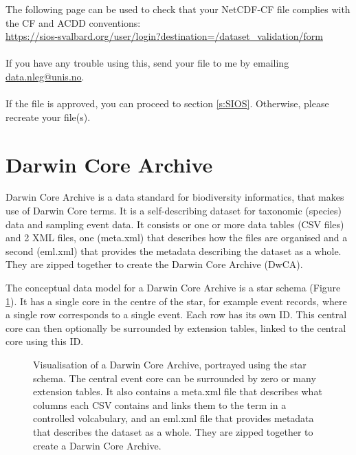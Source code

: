 \documentclass[a4paper,english, 11pt]{article}
\makeatletter
\newcommand{\emailme}{\href{mailto:data.nleg@unis.no}{data.nleg@unis.no}}
\makeatother
\begin{document}
The following page can be used to check that your NetCDF-CF file complies with the CF and ACDD conventions: \\

\url{https://sios-svalbard.org/user/login?destination=/dataset_validation/form} \\ \\If you have any trouble using this, send your file to me by emailing \emailme .
\\ \\
If the file is approved, you can proceed to section \ref{s:SIOS}. Otherwise, please recreate your file(s). 

\newpage

\section{Darwin Core Archive}
\label{s:DwCA}

Darwin Core Archive is a data standard for biodiversity informatics, that makes use of Darwin Core terms. It is a self-describing dataset for taxonomic (species) data and sampling event data. It consists or one or more data tables (CSV files) and 2 XML files, one (meta.xml) that describes how the files are organised and a second  (eml.xml) that provides the metadata describing the dataset as a whole. They are zipped together to create the Darwin Core Archive (DwCA).

The conceptual data model for a Darwin Core Archive is a star schema (Figure \ref{fig:dwca}). 
It has a single core in the centre of the star, for example event records, where a single row corresponds to a single event. 
Each row has its own ID.  
This central core can then optionally be surrounded by extension tables, linked to the central core using this ID.

\begin{figure}[htb]
    \caption{\label{fig:dwca}
        Visualisation of a Darwin Core Archive, portrayed using the star schema. The
        central event core can be surrounded by zero or many extension tables.
        It also contains a meta.xml file that describes what columns each CSV contains and links them to the term in a controlled volcabulary, and an eml.xml file that provides metadata that describes the dataset as a whole. They are zipped together to create a Darwin Core Archive.
    }
\end{figure}
\end{document}
